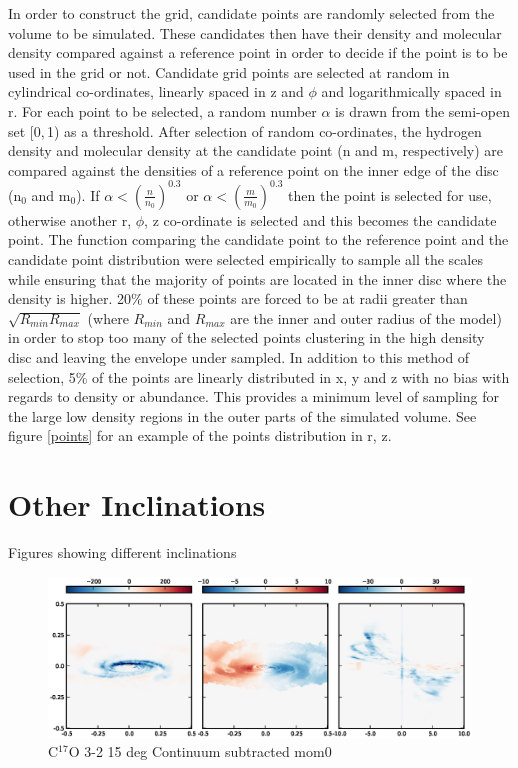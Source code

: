 \documentclass[useAMS,usenatbib]{mn2e}
\begin{document}
In order to construct the grid, candidate points are randomly selected from the volume to be simulated. These candidates then have their density and molecular density compared against a reference point in order to decide if the point is to be used in the grid or not. Candidate grid points are selected at random in cylindrical co-ordinates, linearly spaced in z and $\phi$ and logarithmically spaced in r. For each point to be selected, a random number $\alpha$ is drawn from the semi-open set [0,$\,$1) as a threshold. After selection of random co-ordinates, the hydrogen density and molecular density at the candidate point (n and m, respectively) are compared against the densities of a reference point on the inner edge of the disc (n$_0$ and m$_0$). If $\alpha<\left( \frac{n}{n_0} \right)^{0.3}$ or $\alpha< \left( \frac{m}{m_0} \right)^{0.3}$ then the point is selected for use, otherwise another r, $\phi$, z co-ordinate is selected and this becomes the candidate point. The function comparing the candidate point to the reference point and the candidate point distribution were selected empirically to sample all the scales while ensuring that the majority of points are located in the inner disc where the density is higher. 20\% of these points are forced to be at radii greater than $\sqrt{R_{min}R_{max}}$ (where $R_{min}$ and $R_{max}$ are the inner and outer radius of the model) in order to stop too many of the selected points clustering in the high density disc and leaving the envelope under sampled. In addition to this method of selection, 5\% of the points are linearly distributed in x, y and z with no bias with regards to density or abundance. This provides a minimum level of sampling for the large low density regions in the outer parts of the simulated volume. See figure \ref{points} for an example of the points distribution in r, z. \newline


\section[]{Other Inclinations}

Figures showing different inclinations 
\begin{figure}
 \includegraphics[width=198mm]{Figures/sim/imageC17O_3-2_15deg_all.eps}

 \caption{C$^{17}$O 3-2 15 deg Continuum subtracted mom0}
\end{figure}
\end{document}

